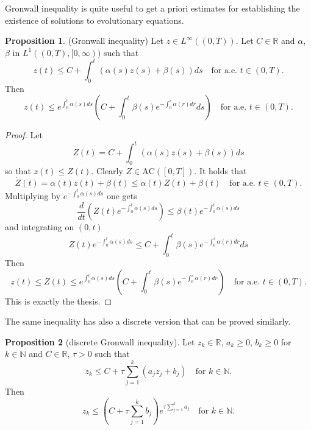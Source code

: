 \documentclass[a4paper,10pt,oneside]{amsbook}
\numberwithin{section}{chapter}
\numberwithin{equation}{chapter}
\theoremstyle{definition}
\newtheorem{prop}{Proposition}[chapter]
\begin{document}
Gronwall inequality is quite useful to get a priori estimates for establishing the existence of solutions to evolutionary equations.
\begin{prop}(Gronwall inequality)
\label{prop:gronwall}
Let $z\in L^\infty((0,T))$. Let $C\in\mathbb{R}$ and $\alpha$, $\beta$ in $L^1((0,T),[0,\infty))$ such that
\begin{equation*}
z(t)\le C+\int_0^t\left(\alpha(s)z(s)+\beta(s)\right)ds\quad\text{for a.e. $t\in(0,T)$}.
\end{equation*}
Then
\begin{equation*}
z(t)\le e^{\int_0^t\alpha(s)ds}\left(C+\int_0^t\beta(s)e^{-\int_0^s\alpha(r)dr}ds\right)\quad\text{for a.e. $t\in(0,T)$}.
\end{equation*}
\end{prop}
\begin{proof}
Let
\begin{equation*}
Z(t)=C+\int_0^t\left(\alpha(s)z(s)+\beta(s)\right)ds
\end{equation*}
so that $z(t)\le Z(t)$. Clearly $Z\in\text{AC}([0,T])$. It holds that
\begin{equation*}
\dot Z(t)=\alpha(t)z(t)+\beta(t)\le\alpha(t)Z(t)+\beta(t)\quad\text{for a.e. $t\in(0,T)$}.
\end{equation*}
Multiplying by $e^{-\int_0^t\alpha(s)ds}$ one gets
\begin{equation*}
\frac{d}{dt}\left(Z(t)e^{-\int_0^t\alpha(s)ds}\right)\le\beta(t)e^{-\int_0^t\alpha(s)ds}
\end{equation*}
and integrating on $(0,t)$
\begin{equation*}
Z(t)e^{-\int_0^t\alpha(s)ds}\le C+\int_0^t\beta(s)e^{-\int_0^s\alpha(r)dr}ds
\end{equation*}
Then
\begin{equation*}
z(t)\le Z(t)\le e^{\int_0^t\alpha(s)ds}\left(C+\int_0^t\beta(s)e^{-\int_0^s\alpha(r)dr}\right)\quad\text{for a.e. $t\in(0,T)$}.
\end{equation*}
This is exactly the thesis.
\end{proof}
The same inequality has also a discrete version that can be proved similarly.
\begin{prop}[discrete Gronwall inequality]
\label{prop:discrete-gronwall}
Let $z_k\in\mathbb{R}$, $a_k\ge0$, $b_k\ge 0$ for $k\in\mathbb{N}$ and $C\in\mathbb{R}$, $\tau>0$ such that
\[
z_k\le C+\tau\sum_{j=1}^k(a_jz_j+b_j)\quad\text{for $k\in\mathbb{N}$}.
\]
Then
\[
z_k\le\left(C+\tau\sum_{j=1}^kb_j\right)e^{\tau\sum_{j=1}^ka_j}\quad\text{for $k\in\mathbb{N}$}.
\]
\end{prop}
\end{document}
